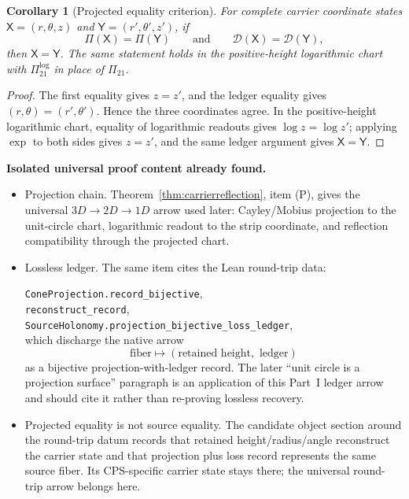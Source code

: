 \documentclass[11pt]{article}
\newtheorem{corollary}[theorem]{Corollary}
\theoremstyle{definition}
\begin{document}
\begin{corollary}[Projected equality criterion]\label{cor:g2-projected-equality}
For complete carrier coordinate states
\(\mathsf X=(r,\theta,z)\) and \(\mathsf Y=(r',\theta',z')\), if
\[
\Pi(\mathsf X)=\Pi(\mathsf Y)
\qquad\text{and}\qquad
\mathcal D(\mathsf X)=\mathcal D(\mathsf Y),
\]
then \(\mathsf X=\mathsf Y\).  The same statement holds in the
positive-height logarithmic chart with \(\Pi^{\log}_{21}\) in place of
\(\Pi_{21}\).
\end{corollary}

\begin{proof}
The first equality gives \(z=z'\), and the ledger equality gives
\((r,\theta)=(r',\theta')\).  Hence the three coordinates agree.  In the
positive-height logarithmic chart, equality of logarithmic readouts gives
\(\log z=\log z'\); applying \(\exp\) to both sides gives \(z=z'\), and the
same ledger argument gives \(\mathsf X=\mathsf Y\).
\end{proof}

\iffalse
\noindent\textbf{Isolated universal proof content already found.}
\begin{itemize}
\item \textup{Projection chain.} Theorem~\ref{thm:carrierreflection},
item \textup{(P)}, gives the universal \(3D\to2D\to1D\) arrow used later:
Cayley/Mobius projection to the unit-circle chart, logarithmic readout to the
strip coordinate, and reflection compatibility through the projected chart.
\item \textup{Lossless ledger.} The same item cites the Lean round-trip
data:

\texttt{ConeProjection.record\_bijective}, \\

\texttt{reconstruct\_record}, \\

\texttt{SourceHolonomy.projection\_bijective\_loss\_ledger}, \\

which discharge the native arrow
\[
\text{fiber}\longmapsto
(\text{retained height},\text{ ledger})
\]
as a bijective projection-with-ledger record.  The later ``unit circle is a
projection surface'' paragraph is an application of this Part~I ledger arrow
and should cite it rather than re-proving lossless recovery.
\item \textup{Projected equality is not source equality.} The candidate
object section around the round-trip datum records that retained
height/radius/angle reconstruct the carrier state and that projection plus
loss record represents the same source fiber.  Its CPS-specific carrier state
stays there; the universal round-trip arrow belongs here.
\end{itemize}
\end{document}
